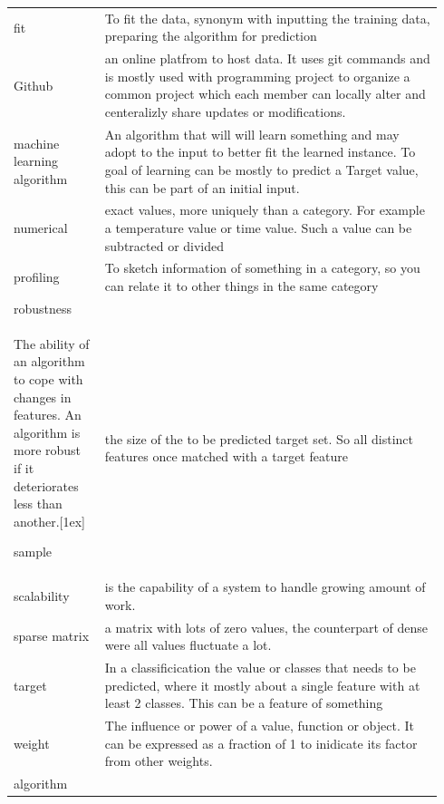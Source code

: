 \documentclass[a4paper,10pt]{article}
\begin{document}
\begin{tabular}{ p{0.20\linewidth} p{0.7437\linewidth} }
	fit & To fit the data, synonym with inputting the training data, preparing the algorithm for prediction\\ [1ex]
	
	Github & an online platfrom to host data. It uses git commands and is mostly used with programming project to organize a common project which each member can locally alter and centeralizly share updates or modifications. \\ [1ex]	
	
	machine learning algorithm & An algorithm that will will learn something and may adopt to the input to better fit the learned instance. To goal of learning can be mostly to predict a Target value, this can be part of an initial input.\\ [1ex]	
	
	numerical & exact values, more uniquely than a category. For example a temperature value or time value. Such a value can be subtracted or divided \\ [1ex]	
	
	profiling & To sketch information of something in a category, so you can relate it to other things in the same category\\ [1ex]
	
	robustness & \\ The ability of an algorithm to cope with changes in features. An algorithm is more robust if it deteriorates less than another.[1ex]	
	
	sample & the size of the to be predicted target set. So all distinct features once matched with a target feature\\ [1ex]
	
	scalability & is the capability of a system to handle growing amount of work. \\[1ex]
	
	sparse matrix & a matrix with lots of zero values, the counterpart of dense were all values fluctuate a lot.	\\ [1ex]
	
	target & In a classificication the value or classes that needs to be predicted, where it mostly about a single feature with at least 2 classes. This can be a feature of something \\ [+1ex]
	
	weight & The influence or power of a value, function or object. It can be expressed as a fraction of 1 to inidicate its factor from other weights.	\\ [1ex]
	
	
	
	
	
	
	algorithm & \\ [1ex]	
	\end{tabular}
\end{document}
